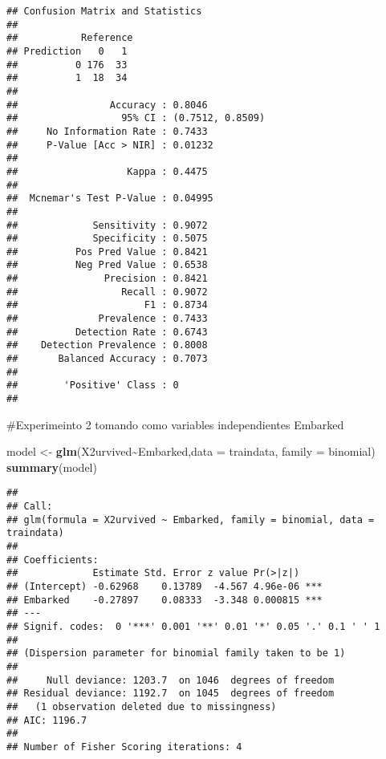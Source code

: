 \documentclass[
]{article}
\newenvironment{Shaded}{\begin{snugshade}}{\end{snugshade}}
\newcommand{\AttributeTok}[1]{\textcolor[rgb]{0.13,0.29,0.53}{#1}}
\newcommand{\FunctionTok}[1]{\textcolor[rgb]{0.13,0.29,0.53}{\textbf{#1}}}
\newcommand{\NormalTok}[1]{#1}
\newcommand{\OtherTok}[1]{\textcolor[rgb]{0.56,0.35,0.01}{#1}}
\newcommand{\SpecialCharTok}[1]{\textcolor[rgb]{0.81,0.36,0.00}{\textbf{#1}}}
\begin{document}
\begin{verbatim}
## Confusion Matrix and Statistics
## 
##           Reference
## Prediction   0   1
##          0 176  33
##          1  18  34
##                                           
##                Accuracy : 0.8046          
##                  95% CI : (0.7512, 0.8509)
##     No Information Rate : 0.7433          
##     P-Value [Acc > NIR] : 0.01232         
##                                           
##                   Kappa : 0.4475          
##                                           
##  Mcnemar's Test P-Value : 0.04995         
##                                           
##             Sensitivity : 0.9072          
##             Specificity : 0.5075          
##          Pos Pred Value : 0.8421          
##          Neg Pred Value : 0.6538          
##               Precision : 0.8421          
##                  Recall : 0.9072          
##                      F1 : 0.8734          
##              Prevalence : 0.7433          
##          Detection Rate : 0.6743          
##    Detection Prevalence : 0.8008          
##       Balanced Accuracy : 0.7073          
##                                           
##        'Positive' Class : 0               
## 
\end{verbatim}

\#Experimeinto 2 tomando como variables independientes Embarked

\begin{Shaded}
\begin{Highlighting}[]
\NormalTok{model }\OtherTok{\textless{}{-}} \FunctionTok{glm}\NormalTok{(X2urvived}\SpecialCharTok{\textasciitilde{}}\NormalTok{Embarked,}\AttributeTok{data =}\NormalTok{ traindata, }\AttributeTok{family =}\NormalTok{ binomial)}
             \FunctionTok{summary}\NormalTok{(model)}
\end{Highlighting}
\end{Shaded}

\begin{verbatim}
## 
## Call:
## glm(formula = X2urvived ~ Embarked, family = binomial, data = traindata)
## 
## Coefficients:
##             Estimate Std. Error z value Pr(>|z|)    
## (Intercept) -0.62968    0.13789  -4.567 4.96e-06 ***
## Embarked    -0.27897    0.08333  -3.348 0.000815 ***
## ---
## Signif. codes:  0 '***' 0.001 '**' 0.01 '*' 0.05 '.' 0.1 ' ' 1
## 
## (Dispersion parameter for binomial family taken to be 1)
## 
##     Null deviance: 1203.7  on 1046  degrees of freedom
## Residual deviance: 1192.7  on 1045  degrees of freedom
##   (1 observation deleted due to missingness)
## AIC: 1196.7
## 
## Number of Fisher Scoring iterations: 4
\end{verbatim}
\end{document}
